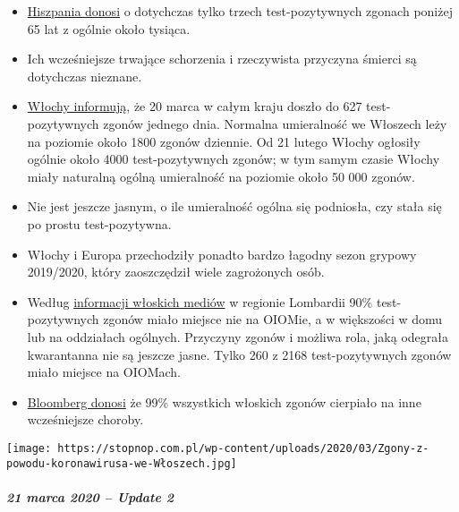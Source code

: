 \begin{itemize}
\tightlist
\item
  \href{https://www.20minutos.es/noticia/4193883/0/media-edad-coronavirus-espana/}{Hiszpania
  donosi} o dotychczas tylko trzech test-pozytywnych zgonach poniżej 65
  lat z ogólnie około tysiąca.
\item
  Ich wcześniejsze trwające schorzenia i rzeczywista przyczyna śmierci
  są dotychczas nieznane.
\item
  \href{https://www.msn.com/en-au/news/coronavirus/italy-coronavirus-deaths-surge-by-627-in-a-day-lifting-total-death-toll-to-4032/ar-BB11tDnS}{Włochy
  informują}, że 20 marca w całym kraju doszło do 627 test-pozytywnych
  zgonów jednego dnia. Normalna umieralność we Włoszech leży na poziomie
  około 1800 zgonów dziennie. Od 21 lutego Włochy ogłosiły ogólnie około
  4000 test-pozytywnych zgonów; w tym samym czasie Włochy miały
  naturalną ogólną umieralność na poziomie około 50 000 zgonów.
\item
  Nie jest jeszcze jasnym, o ile umieralność ogólna się podniosła, czy
  stała się po prostu test-pozytywna.
\item
  Włochy i Europa przechodziły ponadto bardzo łagodny sezon grypowy
  2019/2020, który zaoszczędził wiele zagrożonych osób.
\item
  Według
  \href{https://www.tgcom24.mediaset.it/cronaca/coronavirus-in-lombardia-9-morti-su-10-mai-giunti-in-terapia-intensiva_16362350-202002a.shtml}{informacji
  włoskich mediów} w regionie Lombardii 90\% test-pozytywnych zgonów
  miało miejsce nie na OIOMie, a w większości w domu lub na oddziałach
  ogólnych. Przyczyny zgonów i możliwa rola, jaką odegrała kwarantanna
  nie są jeszcze jasne. Tylko 260 z 2168 test-pozytywnych zgonów miało
  miejsce na OIOMach.
\item
  \href{https://www.bloomberg.com/news/articles/2020-03-18/99-of-those-who-died-from-virus-had-other-illness-italy-says}{Bloomberg
  donosi} że 99\% wszystkich włoskich zgonów cierpiało na inne
  wcześniejsze choroby.
\end{itemize}

\texttt{[image: https://stopnop.com.pl/wp-content/uploads/2020/03/Zgony-z-powodu-koronawirusa-we-Włoszech.jpg]}

\hypertarget{21-marca-2020--update-2}{%
\subparagraph{\texorpdfstring{\textbf{21 marca 2020 -- Update
2}}{21 marca 2020 -- Update 2}}\label{21-marca-2020--update-2}}

